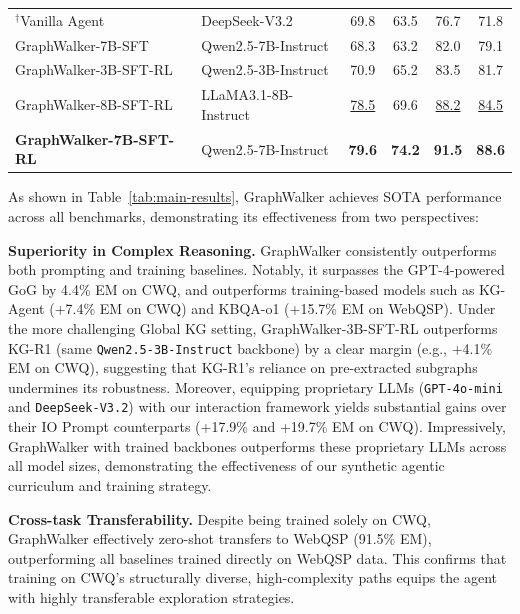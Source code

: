 \begin{table}[t]
\begin{tabular}{l|l|cc|cc}
  ${}^{\dagger}$Vanilla Agent
    & DeepSeek-V3.2
    & 69.8 & 63.5
    & 76.7 & 71.8 \\
  \rowcolor{blue!8}
  GraphWalker-7B-SFT
    & Qwen2.5-7B-Instruct
    & 68.3 & 63.2 & 82.0 & 79.1 \\
  \rowcolor{blue!8}
  GraphWalker-3B-SFT-RL
    & Qwen2.5-3B-Instruct
    & 70.9 & 65.2 & 83.5 & 81.7 \\
  \rowcolor{blue!8}
  GraphWalker-8B-SFT-RL
    & LLaMA3.1-8B-Instruct
    & \underline{78.5} & 69.6 & \underline{88.2} & \underline{84.5} \\
  \rowcolor{blue!15}
  \textbf{GraphWalker-7B-SFT-RL}
    & Qwen2.5-7B-Instruct
    & \textbf{79.6} & \textbf{74.2}
    & \textbf{91.5} & \textbf{88.6} \\
  \bottomrule
  \end{tabular}
  \vspace{-16pt}
\end{table}


As shown in Table~\ref{tab:main-results}, GraphWalker achieves SOTA performance across all benchmarks, demonstrating its effectiveness from two perspectives:

\textbf{Superiority in Complex Reasoning.} 
GraphWalker consistently outperforms both prompting and training baselines.
Notably, it surpasses the GPT-4-powered GoG by 4.4\% EM on CWQ, and outperforms training-based models such as KG-Agent (+7.4\% EM on CWQ) and KBQA-o1 (+15.7\% EM on WebQSP).
Under the more challenging Global KG setting, GraphWalker-3B-SFT-RL outperforms KG-R1 (same \texttt{Qwen2.5-3B-Instruct} backbone) by a clear margin (e.g., +4.1\% EM on CWQ), suggesting that KG-R1's reliance on pre-extracted subgraphs undermines its robustness.
Moreover, equipping proprietary LLMs (\texttt{GPT-4o-mini} and \texttt{DeepSeek-V3.2}) with our interaction framework yields substantial gains over their IO Prompt counterparts (+17.9\% and +19.7\% EM on CWQ). 
Impressively, GraphWalker with trained backbones outperforms these proprietary LLMs across all model sizes, demonstrating the effectiveness of our synthetic agentic curriculum and training strategy.


\textbf{Cross-task Transferability.} Despite being trained solely on CWQ, GraphWalker effectively zero-shot transfers to WebQSP (91.5\% EM), outperforming all baselines trained directly on WebQSP data. This confirms that training on CWQ's structurally diverse, high-complexity paths equips the agent with highly transferable exploration strategies.






